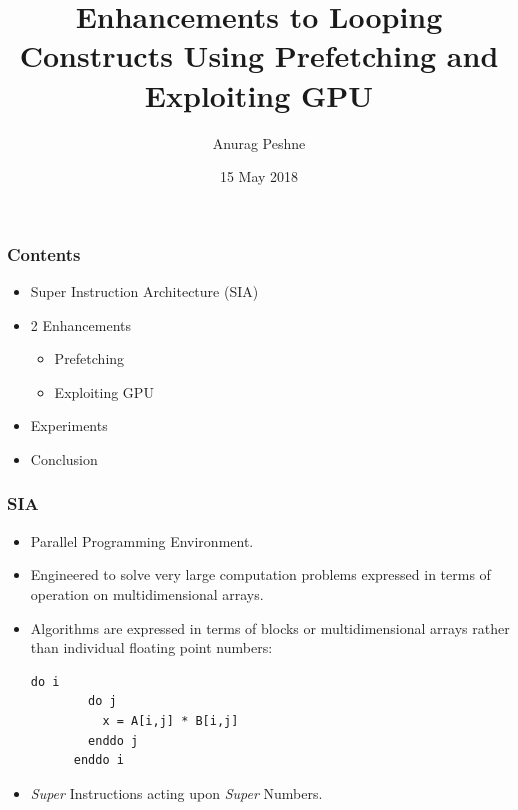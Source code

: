 \documentclass{beamer}
\title{Enhancements to Looping Constructs Using Prefetching and Exploiting GPU}
\author{Anurag Peshne}
\date{15 May 2018}
\begin{document}
\begin{frame}
  \titlepage
\end{frame}

\begin{frame}\frametitle{Contents}
  \pause
  \begin{itemize}
  \item Super Instruction Architecture (SIA)
    \pause
  \item 2 Enhancements
    \pause
    \begin{itemize}
    \item Prefetching
      \pause
    \item Exploiting GPU
      \pause
    \end{itemize}
  \item Experiments
    \pause
  \item Conclusion
  \end{itemize}
\end{frame}

\begin{frame}[fragile]\frametitle{SIA}
  \begin{itemize}
    \pause
  \item Parallel Programming Environment.
    \pause
  \item Engineered to solve very large computation problems expressed in terms of
    operation on multidimensional arrays.
    \pause
  \item Algorithms are expressed in terms of blocks or multidimensional arrays
    rather than individual floating point numbers:
    \begin{lstlisting}[]
      do i
        do j
          x = A[i,j] * B[i,j]
        enddo j
      enddo i
    \end{lstlisting}
    \pause
  \item \textit{Super} Instructions acting upon \textit{Super} Numbers.
  \end{itemize}
\end{frame}
\end{document}
